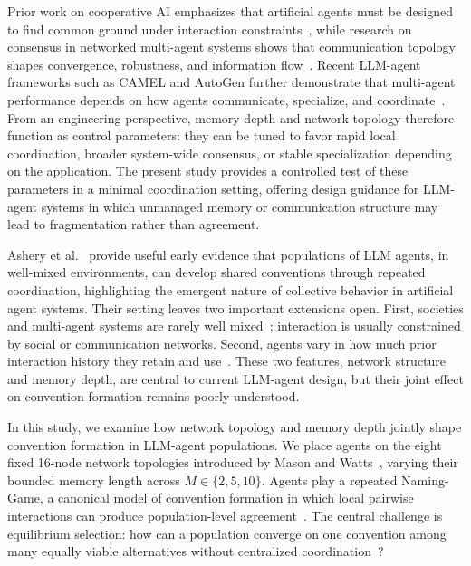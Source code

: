 \documentclass{article}
\begin{document}
Prior work on cooperative AI emphasizes that artificial agents must be designed to find common ground under interaction constraints~\cite{dafoe2021cooperative}, while research on consensus in networked multi-agent systems shows that communication topology shapes convergence, robustness, and information flow~\cite{olfati2007consensus}. Recent LLM-agent frameworks such as CAMEL and AutoGen further demonstrate that multi-agent performance depends on how agents communicate, specialize, and coordinate~\cite{li2023camel, wu2023autogen}. From an engineering perspective, memory depth and network topology therefore function as control parameters: they can be tuned to favor rapid local coordination, broader system-wide consensus, or stable specialization depending on the application. The present study provides a controlled test of these parameters in a minimal coordination setting, offering design guidance for LLM-agent systems in which unmanaged memory or communication structure may lead to fragmentation rather than agreement.

Ashery et al.~\cite{ashery2025emergent} provide useful early evidence that populations of LLM agents, in well-mixed environments, can develop shared conventions through repeated coordination, highlighting the emergent nature of collective behavior in artificial agent systems. Their setting leaves two important extensions open. First, societies and multi-agent systems are rarely well mixed~\cite{newman2018networks}; interaction is usually constrained by social or communication networks. Second, agents vary in how much prior interaction history they retain and use~\cite{zhang2025survey,packer2023memgpt}. These two features, network structure and memory depth, are central to current LLM-agent design, but their joint effect on convention formation remains poorly understood.

In this study, we examine how network topology and memory depth jointly shape convention formation in LLM-agent populations. We place agents on the eight fixed 16-node network topologies introduced by Mason and Watts~\cite{mason2012collaborative}, varying their bounded memory length across $M \in \{2,5,10\}$. Agents play a repeated Naming-Game, a canonical model of convention formation in which local pairwise interactions can produce population-level agreement~\cite{baronchelli2018emergence,lewis1969convention,steels1995self,garrod1994conversation,wittgenstein2009philosophical}. The central challenge is equilibrium selection: how can a population converge on one convention among many equally viable alternatives without centralized coordination~\cite{lewis1969convention}?
\end{document}

